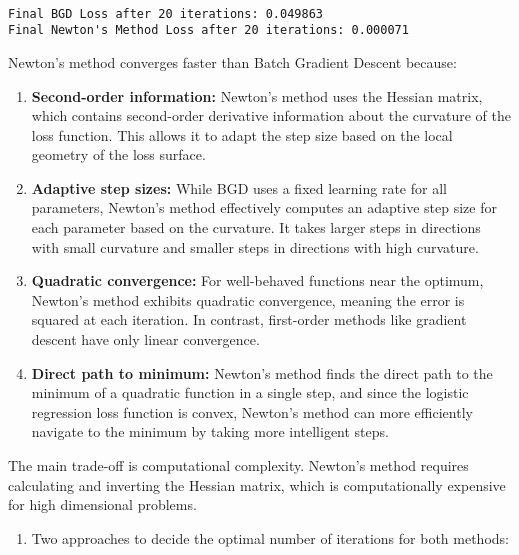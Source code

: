 \documentclass[11pt]{article}
\providecommand{\tightlist}{%
      \setlength{\itemsep}{0pt}\setlength{\parskip}{0pt}}
\begin{document}
    \begin{center}
    \end{center}
    { \hspace*{\fill} \\}
    
    \begin{Verbatim}[commandchars=\\\{\}]
Final BGD Loss after 20 iterations: 0.049863
Final Newton's Method Loss after 20 iterations: 0.000071
    \end{Verbatim}

    Newton's method converges faster than Batch Gradient Descent because:

\begin{enumerate}
\def\labelenumi{\arabic{enumi}.}
\item
  \textbf{Second-order information:} Newton's method uses the Hessian
  matrix, which contains second-order derivative information about the
  curvature of the loss function. This allows it to adapt the step size
  based on the local geometry of the loss surface.
\item
  \textbf{Adaptive step sizes:} While BGD uses a fixed learning rate for
  all parameters, Newton's method effectively computes an adaptive step
  size for each parameter based on the curvature. It takes larger steps
  in directions with small curvature and smaller steps in directions
  with high curvature.
\item
  \textbf{Quadratic convergence:} For well-behaved functions near the
  optimum, Newton's method exhibits quadratic convergence, meaning the
  error is squared at each iteration. In contrast, first-order methods
  like gradient descent have only linear convergence.
\item
  \textbf{Direct path to minimum:} Newton's method finds the direct path
  to the minimum of a quadratic function in a single step, and since the
  logistic regression loss function is convex, Newton's method can more
  efficiently navigate to the minimum by taking more intelligent steps.
\end{enumerate}

The main trade-off is computational complexity. Newton's method requires
calculating and inverting the Hessian matrix, which is computationally
expensive for high dimensional problems.

    \begin{enumerate}
\def\labelenumi{\arabic{enumi}.}
\setcounter{enumi}{5}
\tightlist
\item
  Two approaches to decide the optimal number of iterations for both
  methods:
\end{enumerate}
\end{document}
